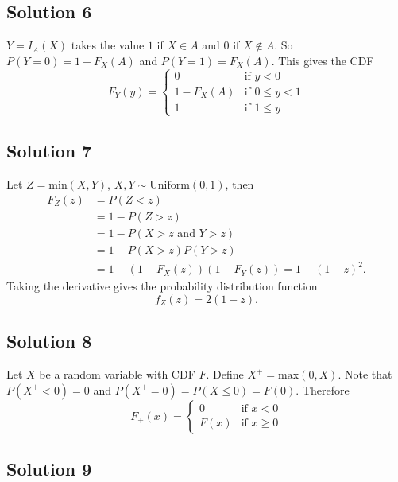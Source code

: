 \subsection*{Solution 6}

$Y = I_A(X)$ takes the value $1$ if $X \in A$ and $0$ if $X \notin A$.
So $P(Y = 0) = 1 - F_X(A)$ and $P(Y = 1) = F_X(A)$.
This gives the CDF
$$
F_Y(y) = \left\{ \begin{array}{ll}
    0 & \text{if } y < 0 \\
    1 - F_X(A) & \text{if } 0 \leq y < 1 \\
    1 & \text{if } 1 \leq y
\end{array} \right.
$$


\subsection*{Solution 7}

Let $Z = \mathrm{min}(X, Y)$, $X, Y \sim \mathrm{Uniform}(0, 1)$, then
\begin{equation*}
\begin{split}
F_Z(z) &= P(Z < z) \\
    &= 1 - P(Z > z) \\
    &= 1 - P(X > z \text{ and } Y > z) \\
    &= 1 - P(X > z)P(Y > z) \\
    &= 1 -(1 - F_X(z))(1 - F_Y(z))
    = 1 - (1 - z)^2.
\end{split}
\end{equation*}
Taking the derivative gives the probability distribution function
$$
f_Z(z) = 2 (1 - z).
$$


\subsection*{Solution 8}

Let $X$ be a random variable with CDF $F$.
Define $X^+ = \mathrm{max}(0, X)$.
Note that $P(X^+ < 0) = 0$ and $P(X^+ = 0) = P(X \leq 0) = F(0)$.
Therefore
\begin{equation*}
    F_+(x) = \left\{ \begin{array}{ll}
        0 & \text{if } x < 0 \\
        F(x) & \text{if } x \geq 0
    \end{array} \right.
\end{equation*}


\subsection*{Solution 9}

